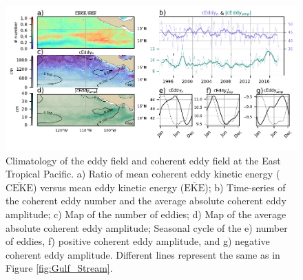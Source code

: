\documentclass[draft,linenumbers]{agujournal2019}
\newcommand{\MEKE}{\overline{\textrm{EKE}}}
\newcommand{\MCEKE}{\overline{\textrm{CEKE}}}
\begin{document}
	\begin{figure}
	    \centering
	    \includegraphics[width=1\textwidth]{figures/regional_ratios_and_stats_V3_3.pdf}
	    \caption{Climatology of the eddy field and coherent eddy field at the East Tropical Pacific. a) Ratio of mean coherent eddy kinetic energy ($\MCEKE$) versus mean eddy kinetic energy ($\MEKE$); b) Time-series of the coherent eddy number and the average absolute coherent eddy amplitude; c) Map of the number of eddies; d) Map of the average absolute coherent eddy amplitude; Seasonal cycle of the e) number of eddies, f) positive coherent eddy amplitude, and g) negative coherent eddy amplitude. Different lines represent the same as in Figure \ref{fig:Gulf_Stream}.}
	    \label{fig:tehuantepec}
	\end{figure}	








\end{document}
